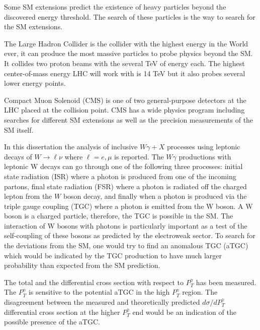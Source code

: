 Some SM extensions predict the existence of heavy particles beyond the discovered energy threshold. The search of these particles is the way to search for the SM extensions.  

The Large Hadron Collider is the collider with the highest energy in the World ever, it can produce the most massive particles to probe physics beyond the SM. It collides two proton beams with the several TeV of energy each. The highest center-of-mass energy LHC will work with is 14 TeV but it also probes several lower energy points. 

Compact Muon Solenoid (CMS) is one of two general-purpose detectors at the LHC placed at the collision point. CMS has a wide physics program including searches for different SM extensions as well as the precision measurements of the SM itself.  

In this dissertation the analysis of inclusive $W\gamma + X$  processes using  leptonic decays of $W\to \ell\nu$ where $\ell = e, \mu$ is reported. The $W\gamma$ productions with leptonic W decays can go through one of the following three processes: initial state radiation (ISR) where a photon is produced from one of the incoming partons, final state radiation (FSR) where a photon is radiated off the charged lepton from the $W$ boson decay, and finally when a photon is produced via the triple gauge coupling (TGC) where a photon is emitted from the W boson. A W boson is a charged particle, therefore, the TGC is possible in the SM. The interaction of W bosons with photons is particularly important as a test of the self-coupling of these bosons as predicted by the electroweak sector. To search for the deviations from the SM, one would try to find an anomalous TGC (aTGC) which would be indicated by the TGC production to have much larger probability than expected from the SM prediction.

The total and the differential cross section with respect to $P_T^{\gamma}$ has been measured. The $P_T^{\gamma}$ is sensitive to the potential aTGC in the high $P_T^{\gamma}$ region. The disagreement between the measured and theoretically predicted $d\sigma/dP_T^{\gamma}$ differential cross section at the higher $P_T^{\gamma}$ end would be an indication of the possible presence of the aTGC.


%
%
%
%
%
%
